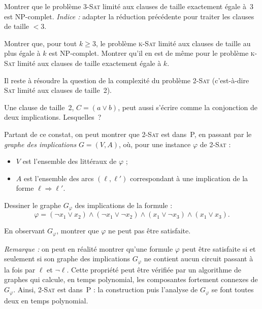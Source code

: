 \begin{exercice}
\begin{questions}
    \item Montrer que le problème \textsc{3-Sat} limité aux clauses de taille exactement égale à~3 est NP-complet.  
    \emph{Indice :} adapter la réduction précédente pour traiter les clauses de taille $< 3$.

    \item Montrer que, pour tout $k \ge 3$, le problème \textsc{k-Sat} limité aux clauses de taille au plus égale à $k$ est NP-complet.  
    Montrer qu’il en est de même pour le problème \textsc{k-Sat} limité aux clauses de taille exactement égale à $k$.

    \medskip
    Il reste à résoudre la question de la complexité du problème \textsc{2-Sat} (c’est-à-dire \textsc{Sat} limité aux clauses de taille~2).

    \item Une clause de taille~2, $C = (a \lor b)$, peut aussi s’écrire comme la conjonction de deux implications.  
    Lesquelles~?

    \medskip
    Partant de ce constat, on peut montrer que \textsc{2-Sat} est dans~P, en passant par le \emph{graphe des implications} $G = (V, A)$, où, pour une instance $\varphi$ de \textsc{2-Sat} :
    \begin{itemize}
    \item $V$ est l’ensemble des littéraux de $\varphi$ ;
    \item $A$ est l’ensemble des arcs $(\ell, \ell')$ correspondant à une implication de la forme $\ell \Rightarrow \ell'$.
    \end{itemize}

    \item Dessiner le graphe $G_\varphi$ des implications de la formule :
    \[
    \varphi = (\neg x_1 \lor x_2) \land (\neg x_1 \lor \neg x_2) \land (x_1 \lor \neg x_3) \land (x_1 \lor x_3).
    \]

    \item En observant $G_\varphi$, montrer que $\varphi$ ne peut pas être satisfaite.

    \medskip
    \emph{Remarque :} on peut en réalité montrer qu’une formule $\varphi$ peut être satisfaite si et seulement si son graphe des implications $G_\varphi$ ne contient aucun circuit passant à la fois par $\ell$ et $\neg\ell$.  
    Cette propriété peut être vérifiée par un algorithme de graphes qui calcule, en temps polynomial, les composantes fortement connexes de $G_\varphi$.  
    Ainsi, \textsc{2-Sat} est dans~P : la construction puis l’analyse de $G_\varphi$ se font toutes deux en temps polynomial.
  \end{questions}

\end{exercice}

